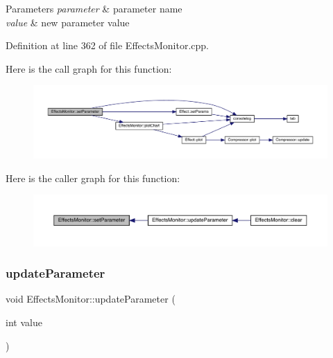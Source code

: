 \begin{DoxyParams}{Parameters}
{\em parameter} & parameter name \\
\hline
{\em value} & new parameter value \\
\hline
\end{DoxyParams}


Definition at line 362 of file Effects\+Monitor.\+cpp.

Here is the call graph for this function\+:
\nopagebreak
\begin{figure}[H]
\begin{center}
\leavevmode
\includegraphics[width=350pt]{class_effects_monitor_a96ff58c6076dd68e03aea26896b69d78_cgraph}
\end{center}
\end{figure}
Here is the caller graph for this function\+:
\nopagebreak
\begin{figure}[H]
\begin{center}
\leavevmode
\includegraphics[width=350pt]{class_effects_monitor_a96ff58c6076dd68e03aea26896b69d78_icgraph}
\end{center}
\end{figure}
\mbox{\label{class_effects_monitor_ae2cc992b9bb457da2a0cdab854a414ea}} 
\subsubsection{\texorpdfstring{update\+Parameter}{updateParameter}\hspace{0.1cm}{\footnotesize\ttfamily [1/4]}}
{\footnotesize\ttfamily void Effects\+Monitor\+::update\+Parameter (\begin{DoxyParamCaption}\item[{int}]{value }\end{DoxyParamCaption})\hspace{0.3cm}{\ttfamily [slot]}}


